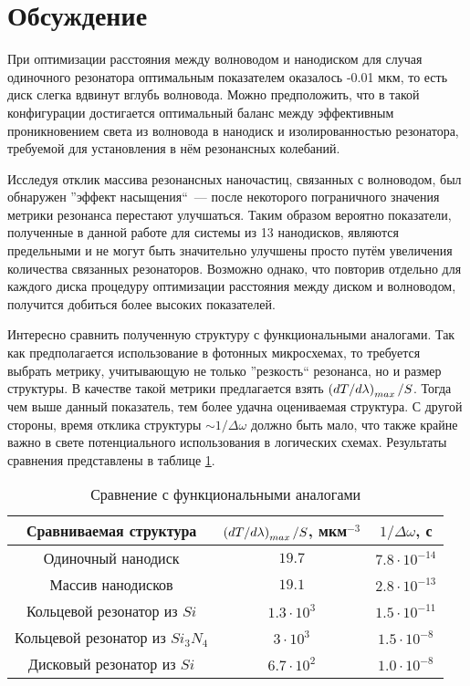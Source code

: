 \section{Обсуждение}

При оптимизации расстояния между волноводом и нанодиском для случая одиночного резонатора оптимальным показателем оказалось -0.01 мкм, то есть диск слегка вдвинут вглубь волновода. Можно предположить, что в такой конфигурации достигается оптимальный баланс между эффективным проникновением света из волновода в нанодиск и изолированностью резонатора, требуемой для установления в нём резонансных колебаний.

Исследуя отклик массива резонансных наночастиц, связанных с волноводом, был обнаружен ''эффект насыщения``~--- после некоторого пограничного значения метрики резонанса перестают улучшаться. Таким образом вероятно показатели, полученные в данной работе для системы из 13 нанодисков, являются предельными и не могут быть значительно улучшены просто путём увеличения количества связанных резонаторов. Возможно однако, что повторив отдельно для каждого диска процедуру оптимизации расстояния между диском и волноводом, получится добиться более высоких показателей.

Интересно сравнить полученную структуру с функциональными аналогами. Так как предполагается использование в фотонных микросхемах, то требуется выбрать метрику, учитывающую не только ''резкость`` резонанса, но и размер структуры. В качестве такой метрики предлагается взять $\left( dT/d\lambda \right)_{max}/S$. Тогда чем выше данный показатель, тем более удачна оцениваемая структура. С другой стороны, время отклика структуры $\sim 1/\Delta \omega$ должно быть мало, что также крайне важно в свете потенциального использования в логических схемах. Результаты сравнения представлены в таблице \ref{tbl:functional_compare}.

\begin{table}[H]
	\centering
	\begin{tabular}{|c|c|c|}
		\hline
		Сравниваемая структура & $\left( dT/d\lambda \right)_{max}/S$, мкм$^{-3}$ & $1/\Delta \omega$, с \\
		\hline
		Одиночный нанодиск & $19.7$ & $7.8 \cdot 10^{-14}$\\
		\hline
		Массив нанодисков & $19.1$ & $2.8 \cdot 10^{-13}$\\
		\hline
		Кольцевой резонатор из $Si$ \cite{Vilson2004} & $1.3 \cdot 10^3$ & $1.5 \cdot 10^{-11}$\\
		\hline
		Кольцевой резонатор из $Si_3 N_4$ \cite{Gondarenko2009} & $3 \cdot 10^3$ & $1.5 \cdot 10^{-8}$\\
		\hline
		Дисковый резонатор из $Si$ \cite{Soltani2007} & $6.7 \cdot 10^2$ & $1.0 \cdot 10^{-8}$\\
		\hline
	\end{tabular}
	\caption{Сравнение с функциональными аналогами}
	\label{tbl:functional_compare}
\end{table}

